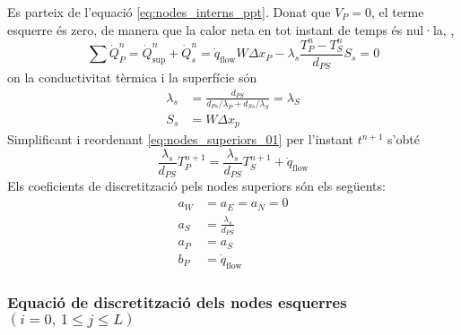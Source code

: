\noindent
Es parteix de l'equació \eqref{eq:nodes_interns_ppt}. Donat que $V_P = 0$, el terme esquerre és zero, de manera que la calor neta en tot instant de temps és nul·la, \ie,
\begin{equation} \label{eq:nodes_superiors_01}
	\sum \dot{Q}_P^n = 
	\dot{Q}_\text{sup}^n + \dot{Q}_s^n = 
	\dot{q}_\text{flow} W \Delta x_P - 
	\lambda_s \frac{T_P^n - T_S^n}{d_{PS}} S_s = 0
\end{equation}
on la conductivitat tèrmica i la superfície són
\begin{align}
	\lambda_s &= \frac{d_{PS}}{d_{Ps}/\lambda_P + d_{Ss}/\lambda_S} = \lambda_S \\
	S_s &= W \Delta x_p 
\end{align}
Simplificant i reordenant \eqref{eq:nodes_superiors_01} per l'instant $t^{n+1}$ s'obté
\begin{equation} \label{eq:equacio_discretitzacio_nodes_superiors}
	\frac{\lambda_s}{d_{PS}} T_P^{n+1} = 
	\frac{\lambda_s}{d_{PS}} T_S^{n+1} + 
	\dot{q}_\text{flow}
\end{equation}
Els coeficients de discretització pels nodes superiors són els següents:
\begin{align}
	a_W &= a_E = a_N = 0 \\
	a_S &= \frac{\lambda_s}{d_{PS}} \\
	a_P &= a_S \\
	b_P &= \dot{q}_\text{flow}
\end{align}

\subsubsection{Equació de discretització dels nodes esquerres \texorpdfstring{$\left( i = 0, \, 1 \leq j \leq L \right)$}{}}

